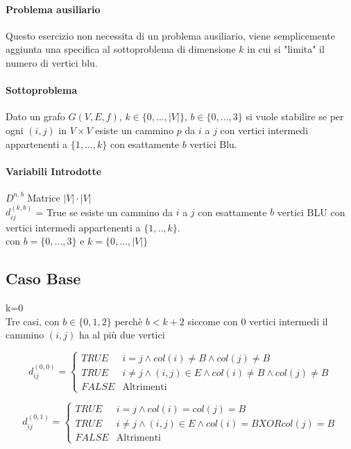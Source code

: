 \documentclass[12pt, a4paper, openany]{book}
\begin{document}
\paragraph*{Problema ausiliario} 
Questo esercizio non necessita di un problema ausiliario, viene semplicemente aggiunta una specifica al sottoproblema di dimensione $k$ in cui si "limita" il numero di vertici blu.

\paragraph*{Sottoproblema}
Dato un grafo $G(V,E,f)$, $k\in\{0,...,|V|\}$, $b\in \{0,...,3\}$ si vuole stabilire se per ogni $(i,j)$ in $V \times V$ esiste un cammino $p$ da $i$ a $j$ con vertici intermedi
appartenenti a $\{1,...,k\}$ con esattamente $b$ vertici Blu.

\paragraph*{Variabili Introdotte}
$D^{n,b}$ Matrice $|V|\cdot|V|$\\
$d^{(k,b)}_{ij}$ = True se esiste un cammino da $i$ a $j$ con esattamente $b$ vertici BLU con vertici intermedi appartenenti a $\{1,..,k\}$.\\
con $b = \{0,...,3\}$ e $k=\{0,...,|V|\}$

\subsection*{Caso Base} k=0\\
Tre casi, con $b \in \{0,1,2\}$ perchè $b < k+2$ siccome con 0 vertici intermedi il cammino $(i,j)$ ha al più due vertici

\begin{equation*}
	d_{ij}^{(0,0)} = \begin{cases}
		TRUE  & i=j\land col(i)\neq B\land col(j)\neq B                      \\
		TRUE  & i\neq j\land (i,j)\in E \land col(i)\neq B\land col(j)\neq B \\
		FALSE & \text{Altrimenti}
	\end{cases}
\end{equation*}

\begin{equation*}
	d_{ij}^{(0,1)} = \begin{cases}
		TRUE  & i=j\land col(i)= col(j) = B                          \\
		TRUE  & i\neq j\land (i,j)\in E \land col(i)= B XOR col(j)=B \\
		FALSE & \text{Altrimenti}
	\end{cases}
\end{equation*}
\end{document}
